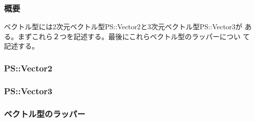 \subsubsection{概要}

ベクトル型には2次元ベクトル型PS::Vector2と3次元ベクトル型PS::Vector3が
ある。まずこれら２つを記述する。最後にこれらベクトル型のラッパーについ
て記述する。

\subsubsection{PS::Vector2}



\subsubsection{PS::Vector3}



\subsubsection{ベクトル型のラッパー}



